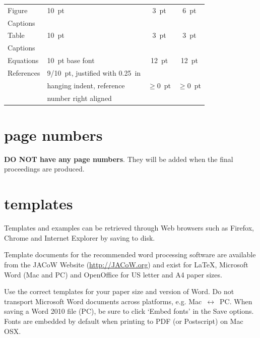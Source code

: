 \documentclass[a4paper]{jacow}
\begin{document}
\begin{table}[h!t]
\begin{tabular}{@{}llcc@{}}
        \midrule
         Figure        & \SI{10}{pt}                 & \SI{3}{pt}           & \SI{6}{pt}  \\
         Captions      &                             &                 &      \\
        \midrule
         Table         & \SI{10}{pt}                      & \SI{3}{pt}           & \SI{3}{pt}  \\
         Captions      &                             &                 &      \\
        \midrule
         Equations     & \SI{10}{pt} base font            & \SI{12}{pt}          & \SI{12}{pt} \\
        \midrule
         References    & \SI{9/10}{pt}, justified with  \SI{0.25}{in} &      &  \\
                       & hanging indent, reference   & $\ge$\SI{0}{pt} & $\ge$\SI{0}{pt}  \\
                       & number right aligned     &                 &        \\
        \bottomrule
    \end{tabular}
\end{table}

\section{page numbers}

\textbf{DO NOT have any page numbers}. They will be added
when the final proceedings are produced.

\section{templates}

Templates and examples can be retrieved through Web
browsers such as Firefox, Chrome and Internet Explorer by saving to disk.

Template documents for the recommended word processing software are
available from the JACoW Website (\url{http://JACoW.org}) and exist for
\LaTeX, Microsoft Word (Mac and PC) and OpenOffice for US letter and A4 paper sizes.

Use the correct templates for  your paper size and version of Word.
Do not transport Microsoft Word documents across platforms, e.g.
Mac~$\leftrightarrow$~PC. When saving a Word 2010 file (PC), be sure
to click `Embed fonts' in the Save options. Fonts are embedded by default
when printing to PDF (or Postscript) on Mac OSX.
\end{document}
